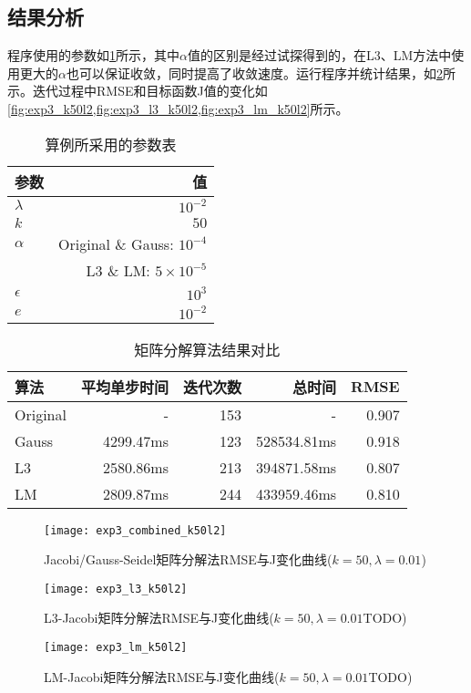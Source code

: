 \documentclass[a4paper,12pt]{article}
\begin{document}
    \subsection{结果分析}
    程序使用的参数如\cref{tbl:exp3para}所示，其中$\alpha$值的区别是经过试探得到的，在L3、LM方法中使用更大的$\alpha$也可以保证收敛，同时提高了收敛速度。运行程序并统计结果，如\cref{tbl:exp3}所示。迭代过程中RMSE和目标函数J值的变化如\cref{fig:exp3_k50l2,fig:exp3_l3_k50l2,fig:exp3_lm_k50l2}所示。

    \begin{table}
      \centering
      \caption{算例所采用的参数表}
      \label{tbl:exp3para}
      \begin{tabular}{lr}
        \toprule
        参数&值\\
        \midrule
        $\lambda$ & $10^{-2}$ \\
        $k$ & $50$ \\
        $\alpha$ & Original \& Gauss: $10^{-4}$\\
         & L3 \& LM: $5\times 10^{-5}$ \\
        $\epsilon$ & $10^{3}$ \\
        $e$ & $10^{-2}$ \\
        \bottomrule
      \end{tabular}
    \end{table}

    \begin{table}
      \centering
      \caption{矩阵分解算法结果对比}
      \label{tbl:exp3}
      \begin{tabular}{lrrrr}
        \toprule
        算法&平均单步时间&迭代次数&总时间&RMSE\\
        \midrule
        Original & - & 153 & - & 0.907 \\
        Gauss & 4299.47ms & 123 & 528534.81ms & 0.918 \\
        L3 & 2580.86ms & 213 & 394871.58ms & 0.807 \\
        LM & 2809.87ms & 244 & 433959.46ms & 0.810 \\
        \bottomrule
      \end{tabular}
    \end{table}

    \begin{figure}[htbp]
      \centering
      \texttt{[image: exp3\_combined\_k50l2]}
      \caption{Jacobi/Gauss-Seidel矩阵分解法RMSE与J变化曲线($k=50,\lambda=0.01$)}
      \label{fig:exp3_k50l2}
    \end{figure}
    \begin{figure}[htbp]
      \centering
      \texttt{[image: exp3\_l3\_k50l2]}
      \caption{L3-Jacobi矩阵分解法RMSE与J变化曲线($k=50,\lambda=0.01$TODO)}
      \label{fig:exp3_l3_k50l2}
    \end{figure}
    \begin{figure}[htbp]
      \centering
      \texttt{[image: exp3\_lm\_k50l2]}
      \caption{LM-Jacobi矩阵分解法RMSE与J变化曲线($k=50,\lambda=0.01$TODO)}
      \label{fig:exp3_lm_k50l2}
    \end{figure}
\end{document}

